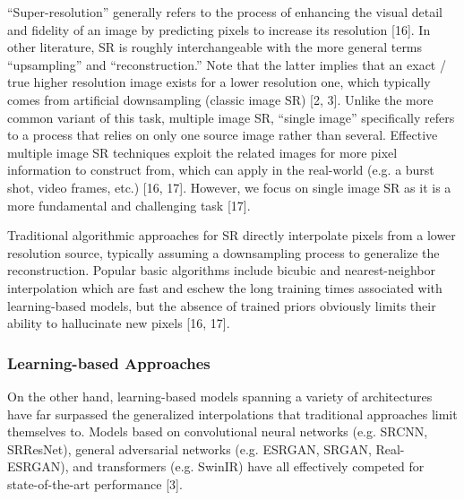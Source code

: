 \documentclass{article}
\begin{document}
“Super-resolution” generally refers to the process of enhancing the visual detail and fidelity of an image by predicting pixels to increase its resolution [16]. In other literature, SR is roughly interchangeable with the more general terms “upsampling” and “reconstruction.” Note that the latter implies that an exact / true higher resolution image exists for a lower resolution one, which typically comes from artificial downsampling (classic image SR) [2, 3]. Unlike the more common variant of this task, multiple image SR, “single image” specifically refers to a process that relies on only one source image rather than several. Effective multiple image SR techniques exploit the related images for more pixel information to construct from, which can apply in the real-world (e.g. a burst shot, video frames, etc.) [16, 17]. However, we focus on single image SR as it is a more fundamental and challenging task [17].

Traditional algorithmic approaches for SR directly interpolate pixels from a lower resolution source, typically assuming a downsampling process to generalize the reconstruction. Popular basic algorithms include bicubic and nearest-neighbor interpolation which are fast and eschew the long training times associated with learning-based models, but the absence of trained priors obviously limits their ability to hallucinate new pixels [16, 17].


\subsubsection{Learning-based Approaches}

On the other hand, learning-based models spanning a variety of architectures have far surpassed the generalized interpolations that traditional approaches limit themselves to. Models based on convolutional neural networks (e.g. SRCNN, SRResNet), general adversarial networks (e.g. ESRGAN, SRGAN, Real-ESRGAN), and transformers (e.g. SwinIR) have all effectively competed for state-of-the-art performance [3].
\end{document}
